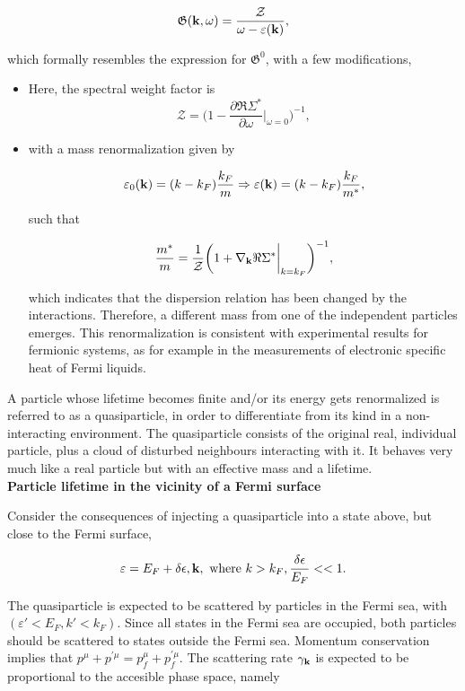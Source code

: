\begin{equation}
     \mathfrak{G}({\bf k}, \omega) = \frac{\mathcal{Z}}{\omega - \varepsilon({\bf k})},
\end{equation}

which formally resembles the expression for $ \mathfrak{G}^{0}$, with a few modifications, 

\begin{itemize}
    \item Here, the spectral weight factor is 
    $$
     \mathcal{Z} = \bigg(1 - \frac{\partial \Re \Sigma^*}{\partial \omega}\bigg|_{\omega = 0}\bigg)^{-1},
    $$
    
    \item with a mass renormalization given by 
    
    $$ 
        \varepsilon_0({\bf k}) = (k-k_F) \frac{k_F}{m} \Rightarrow \varepsilon({\bf k}) = (k-k_F) \frac{k_F}{m^*},
    $$
    
    such that 
    
    $$
        \frac{m^*}{m} = \frac{1}{\mathcal{Z}} \bigg(1 + \nabla_{{\bf k}} \Re \Sigma^*\bigg|_{k=k_F}\bigg)^{-1},
    $$
    
    which indicates that the dispersion relation has been changed by the interactions. Therefore, a different mass from one of the independent particles emerges. This renormalization is consistent with experimental results for fermionic systems, as for example in the measurements of electronic specific heat of Fermi liquids. \\
\end{itemize}

A particle whose lifetime becomes finite and/or its energy gets renormalized is referred to as a quasiparticle, in order to differentiate from its kind in a non-interacting environment. The quasiparticle consists of the original real, individual particle, plus a cloud of disturbed neighbours interacting with it. It behaves very much like a real particle but with an effective mass and a lifetime. \\

\textbf{Particle lifetime in the vicinity of a Fermi surface}

Consider the consequences of injecting a quasiparticle into a state above, but close to the Fermi surface, 

$$
    \varepsilon = E_F + \delta \epsilon, {\bf k}, \textnormal{ where } k > k_F, \frac{\delta \epsilon}{E_F} << 1.
$$

The quasiparticle is expected to be scattered by particles in the Fermi sea, with $(\varepsilon' < E_F, k' < k_F)$. Since all states in the Fermi sea are occupied, both particles should be scattered to states outside the Fermi sea. Momentum conservation implies that $p^{\mu} + p^{'\mu} = p^{\mu}_f + p^{'\mu}_f$. The scattering rate $\gamma_{\bf k}$ is expected to be proportional to the accesible phase space, namely 

